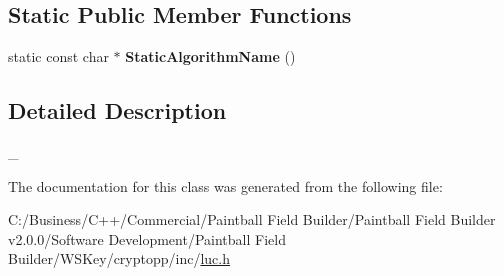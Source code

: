 \subsection*{Static Public Member Functions}
\begin{DoxyCompactItemize}
\item 
\hypertarget{class_d_l___algorithm___l_u_c___h_m_p_a9525cf942f819663b54d163e61b5f70c}{
static const char $\ast$ {\bfseries StaticAlgorithmName} ()}
\label{class_d_l___algorithm___l_u_c___h_m_p_a9525cf942f819663b54d163e61b5f70c}

\end{DoxyCompactItemize}


\subsection{Detailed Description}
\_\- 

The documentation for this class was generated from the following file:\begin{DoxyCompactItemize}
\item 
C:/Business/C++/Commercial/Paintball Field Builder/Paintball Field Builder v2.0.0/Software Development/Paintball Field Builder/WSKey/cryptopp/inc/\hyperlink{luc_8h}{luc.h}\end{DoxyCompactItemize}
